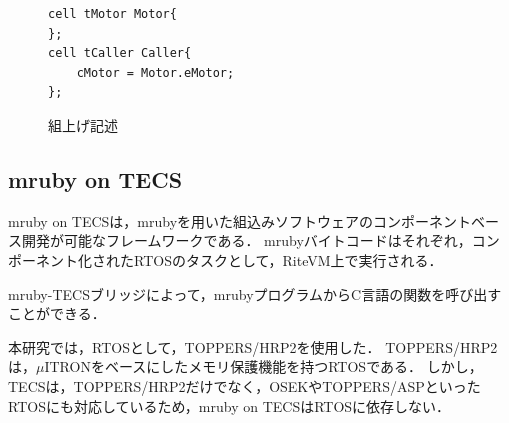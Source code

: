 \documentclass[submit,techrep]{ipsj}
\begin{document}
\begin{figure}[t]
\centering
\begin{lstlisting}
cell tMotor Motor{
};
cell tCaller Caller{
    cMotor = Motor.eMotor;
};
\end{lstlisting}
    \vspace{-2mm}
\caption{組上げ記述}
\vspace{-4mm}
\label{build}
\end{figure}

\vspace{-5mm} 
\subsection{mruby on TECS}
\label{sec:mruby on TECS}
mruby on TECSは，mrubyを用いた組込みソフトウェアのコンポーネントベース開発が可能なフレームワークである．
mrubyバイトコードはそれぞれ，コンポーネント化されたRTOSのタスクとして，RiteVM上で実行される．

mruby-TECSブリッジによって，mrubyプログラムからC言語の関数を呼び出すことができる．

本研究では，RTOSとして，TOPPERS/HRP2\cite{par:hr-tecs}を使用した．
TOPPERS/HRP2は，$\mu$ITRON\cite{par:microITRON}をベースにしたメモリ保護機能を持つRTOSである．
しかし，TECSは，TOPPERS/HRP2だけでなく，OSEK\cite{par:OSEK}やTOPPERS/ASP\cite{par:ASP}といったRTOSにも対応しているため，mruby on TECSはRTOSに依存しない．

\end{document}
